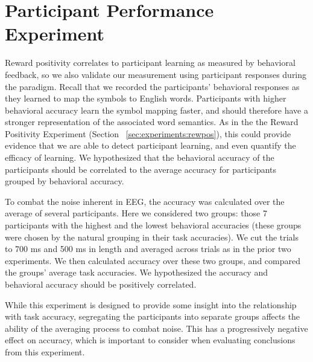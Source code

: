 \section{Participant Performance Experiment}

Reward positivity correlates to participant learning as measured by behavioral 
feedback, so we also validate our measurement using participant responses 
during the paradigm. Recall that we recorded the participants' behavioral 
responses as they learned to map the symbols to English words. Participants 
with higher behavioral accuracy learn the symbol mapping faster, and should 
therefore have a stronger representation of the associated word semantics. As 
in the the Reward Positivity Experiment (Section 
~\ref{sec:experiments:rewpos}), this could provide evidence that we are able to 
detect participant learning, and even quantify the efficacy of learning. We 
hypothesized that the behavioral accuracy of the participants should be 
correlated to the average \tvt accuracy for participants grouped by behavioral 
accuracy.

To combat the noise inherent in EEG, the \tvt accuracy was calculated over the 
average of several participants. Here we considered two groups: those 7 
participants with the highest and the lowest behavioral accuracies (these 
groups were chosen by the natural grouping in their task accuracies). We cut 
the trials to 700 ms and 500 ms in length and averaged across trials as in the 
prior two experiments. We then calculated \tvt accuracy over these two groups, 
and compared the groups' average task accuracies. We hypothesized the \tvt 
accuracy and behavioral accuracy should be positively correlated.

While this experiment is designed to provide some insight into the relationship 
with task accuracy, segregating the participants into separate groups affects 
the ability of the averaging process to combat noise. This has a progressively 
negative effect on \tvt accuracy, which is important to consider when 
evaluating conclusions from this experiment.
